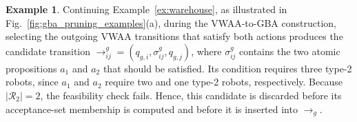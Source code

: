\documentclass[lettersize,journal]{IEEEtran}
\theoremstyle{italiclemma}
\theoremstyle{italiclemma}
\theoremstyle{definition}
\newtheorem{example}{Example}
\begin{document}
\begin{example} \label{ex:gba_pruning1}
Continuing Example~\ref{ex:warehouse}, as illustrated in Fig.~\ref{fig:gba_pruning_examples}(a), during the VWAA-to-GBA construction, selecting the outgoing VWAA transitions that satisfy both actions produces the candidate transition $\rightarrow^g_{ij}=(q_{g,i},\sigma^g_{ij},q_{g,j})$, where $\sigma^g_{ij}$ contains the two atomic propositions $a_1$ and $a_2$ that should be satisfied. Its condition requires three type-2 robots, since $a_1$ and $a_2$ require two and one type-2 robots, respectively. Because $|\mathcal R_2|=2$, the feasibility check fails. Hence, this candidate is discarded before its acceptance-set membership is computed and before it is inserted into $\rightarrow_g$.
\end{example}
\end{document}

